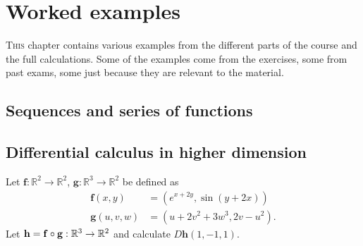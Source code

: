 \chapter{Worked examples}

\lettrine{T}{his} chapter contains various examples from the different parts of the course and the full calculations.
Some of the examples come from the exercises, some from past exams, some just because they are relevant to the material.

\section{Sequences and series of functions}

\section{Differential calculus in higher dimension}

\begin{task}
    Let $\mathbf{f}:\mathbb{R}^2\to\mathbb{R}^2$, $\mathbf{g}:\mathbb{R}^3\to\mathbb{R}^2$ be defined as
    \[
        \begin{aligned}
            \mathbf{f}(x,y)   & = (e^{x+2y}, \sin(y+2x)) \\
            \mathbf{g}(u,v,w) & = (u+2v^2+3w^3,2v-u^2).
        \end{aligned}
    \]
    Let $\mathbf{h} =\mathbf{f} \circ \mathbf{g} : \mathbb{R}^3 \to \mathbb{R}^2$ and calculate \(D\mathbf{h}(1,-1,1)\).
\end{task}

